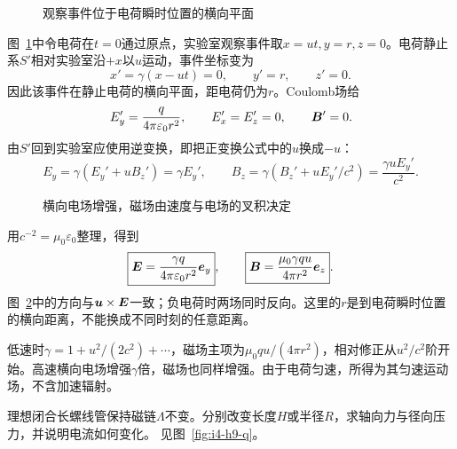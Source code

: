 \begin{figure}[H]\centering
{}
\caption{观察事件位于电荷瞬时位置的横向平面}\label{fig:i4-h8-q}
\end{figure}
\begin{solution}
图~\ref{fig:i4-h8-q}中令电荷在$t=0$通过原点，实验室观察事件取$x=ut,y=r,z=0$。电荷静止系$S'$相对实验室沿$+x$以$u$运动，事件坐标变为
\[
x'=\gamma(x-ut)=0,\qquad y'=r,\qquad z'=0.
\]
因此该事件在静止电荷的横向平面，距电荷仍为$r$。Coulomb场给
\[
E_y'=\frac{q}{4\pi\varepsilon_0r^2},\qquad
E_x'=E_z'=0,\qquad \bm{B}'=0.
\]
由$S'$回到实验室应使用逆变换，即把正变换公式中的$u$换成$-u$：
\[
E_y=\gamma(E_y'+uB_z')=\gamma E_y',\qquad
B_z=\gamma(B_z'+uE_y'/c^2)=\frac{\gamma uE_y'}{c^2}.
\]
\begin{figure}[H]\centering
{}
\caption{横向电场增强，磁场由速度与电场的叉积决定}\label{fig:i4-h8-s}
\end{figure}
用$c^{-2}=\mu_0\varepsilon_0$整理，得到
\[
\boxed{\bm{E}=\frac{\gamma q}{4\pi\varepsilon_0r^2}\bm{e}_y},
\qquad
\boxed{\bm{B}=\frac{\mu_0\gamma qu}{4\pi r^2}\bm{e}_z}.
\]
图~\ref{fig:i4-h8-s}中的方向与$\bm{u}\times\bm{E}$一致；负电荷时两场同时反向。这里的$r$是到电荷瞬时位置的横向距离，不能换成不同时刻的任意距离。

低速时$\gamma=1+u^2/(2c^2)+\cdots$，磁场主项为$\mu_0qu/(4\pi r^2)$，相对修正从$u^2/c^2$阶开始。高速横向电场增强$\gamma$倍，磁场也同样增强。由于电荷匀速，所得为其匀速运动场，不含加速辐射。
\end{solution}

\begin{exercise}[固定磁链螺线管的形变]\label{ex:i4-h9}
理想闭合长螺线管保持磁链$\Lambda$不变。分别改变长度$H$或半径$R$，求轴向力与径向压力，并说明电流如何变化。 见图~\ref{fig:i4-h9-q}。
\end{exercise}


